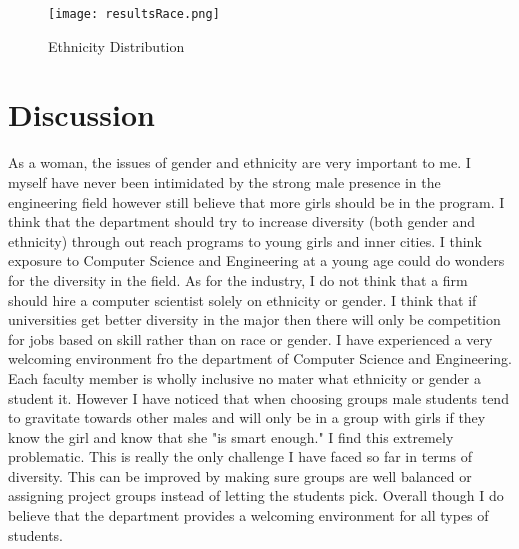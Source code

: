 \documentclass{article}
\begin{document}
\begin{figure}[H] 
    \centering 
    \texttt{[image: resultsRace.png]} 
    \caption{Ethnicity Distribution} 
    \label{fig:ethnicity} 
\end{figure} 

\section*{Discussion}
    As a woman, the issues of gender and ethnicity are very important to 
me.  I myself have never been intimidated by the strong male presence in 
the engineering field however still believe that more girls should be in 
the program.  I think that the department should try to increase 
diversity (both gender and ethnicity) through out reach programs to 
young girls and inner cities.  I think exposure to Computer Science and 
Engineering at a young age could do wonders for the diversity in the 
field.  As for the industry, I do not think that a firm should hire a 
computer scientist solely on ethnicity or gender.  I think that if 
universities get better diversity in the major then there will only be 
competition for jobs based on skill rather than on race or gender.
    I have experienced a very welcoming environment fro the department 
of Computer Science and Engineering.  Each faculty member is wholly 
inclusive no mater what ethnicity or gender a student it.  However I 
have noticed that when choosing groups male students tend to gravitate 
towards other males and will only be in a group with girls if they know 
the girl and know that she "is smart enough."  I find this extremely 
problematic.  This is really the only challenge I have faced so far in 
terms of diversity.  This can be improved by making sure groups are well 
balanced or assigning project groups instead of letting the students 
pick.  Overall though I do believe that the department provides a 
welcoming environment for all types of students. 
\end{document}
